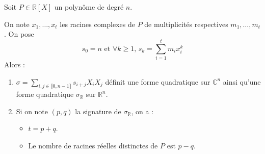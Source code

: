 






  Soit $P \in \mathbb{R}[X]$ un polynôme de degré $n$.

  \begin{theorem}
    On note $x_1, \dots, x_t$ les racines complexes de $P$ de multiplicités respectives $m_1, \dots, m_t$. On pose
    \[ s_0 = n \text{ et } \forall k \geq 1, \, s_k = \sum_{i=1}^t m_i x_i^k \]
    Alors :
    \begin{enumerate}[label={\bfseries(\roman*)}]
      \item $\sigma = \sum_{i, j \in \llbracket 0, n-1 \rrbracket} s_{i+j} X_i X_j$ définit une forme quadratique sur $\mathbb{C}^n$ ainsi qu'une forme quadratique $\sigma_{\mathbb{R}}$ sur $\mathbb{R}^n$.
      \item Si on note $(p,q)$ la signature de $\sigma_{\mathbb{R}}$, on a :
      \begin{itemize}
        \item $t = p + q$.
        \item Le nombre de racines réelles distinctes de $P$ est $p-q$.
      \end{itemize}
    \end{enumerate}
  \end{theorem}

